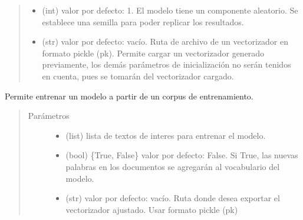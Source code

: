 \documentclass[letterpaper,10pt,openany,spanish]{sphinxmanual}
\begin{document}
\begin{fulllineitems}
\begin{quote}
\begin{description}
\begin{itemize}
\item {} 
 \textendash{} (int) valor por defecto: 1. El modelo tiene un 
componente aleatorio. Se establece una semilla para poder 
replicar los resultados.

\item {} 
 \textendash{} (str) valor por defecto: vacío. Ruta de archivo 
de un vectorizador en formato pickle (pk). Permite cargar un 
vectorizador generado previamente, los demás parámetros de 
inicialización no serán tenidos en cuenta, pues se tomarán del 
vectorizador cargado.

\end{itemize}

\end{description}\end{quote}

\begin{fulllineitems}
\label{\detokenize{funciones/vectorizacion:vectorizacion.VectorizadorDoc2Vec.entrenar_modelo}}
Permite entrenar un modelo a partir de un corpus de entrenamiento.
\begin{quote}\begin{description}
\item[{Parámetros}] \leavevmode\begin{itemize}
\item {} 
 \textendash{} (list) lista de textos de interes para 
entrenar el modelo.

\item {} 
 \textendash{} (bool) \{True, False\} valor por defecto: False. 
Si True, las nuevas palabras en los documentos se agregarán al 
vocabulario del modelo.

\item {} 
 \textendash{} (str) valor por defecto: vacío. Ruta donde 
desea exportar el vectorizador ajustado. Usar formato pickle (pk)


\end{itemize}
\end{description}
\end{quote}
\end{fulllineitems}
\end{fulllineitems}
\end{document}
